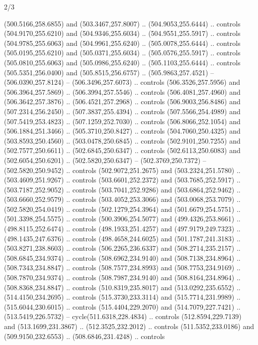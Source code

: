 \begin{flagdescription}{2/3}
\begin{scope}[xshift=0.5\flaglength,yshift=0.5\flagwidth,scale=\flagwidth/495.65]
\begin{scope}[y=0.8pt, x=0.8pt, yscale=-1,shift={(-463.76,-309.78)}]
  (500.5166,258.6855) and (503.3467,257.8007) .. (504.9053,255.6444) .. controls
  (504.9170,255.6210) and (504.9346,255.6034) .. (504.9551,255.5917) .. controls
  (504.9785,255.6063) and (504.9961,255.6240) .. (505.0078,255.6444) .. controls
  (505.0195,255.6210) and (505.0371,255.6034) .. (505.0576,255.5917) .. controls
  (505.0810,255.6063) and (505.0986,255.6240) .. (505.1103,255.6444) .. controls
  (505.5351,256.0400) and (505.8515,256.6757) .. (505.9863,257.4521) --
  (506.0390,257.8124) -- (506.3496,257.6073) .. controls (506.3526,257.5956) and
  (506.3964,257.5869) .. (506.3994,257.5546) .. controls (506.4081,257.4960) and
  (506.3642,257.3876) .. (506.4521,257.2968) .. controls (506.9003,256.8486) and
  (507.2314,256.2450) .. (507.3837,255.4394) .. controls (507.5566,254.4989) and
  (507.5419,253.4823) .. (507.1259,252.7030) .. controls (506.8066,252.1054) and
  (506.1884,251.3466) .. (505.3710,250.8427) .. controls (504.7060,250.4325) and
  (503.8593,250.4560) .. (503.0478,250.6845) .. controls (502.9101,250.7255) and
  (502.7577,250.6611) .. (502.6845,250.6347) .. controls (502.6113,250.6083) and
  (502.6054,250.6201) .. (502.5820,250.6347) -- (502.3769,250.7372) --
  (502.5820,250.9452) .. controls (502.9072,251.2675) and (503.2324,251.5780) ..
  (503.4609,251.9267) .. controls (503.6601,252.2372) and (503.7685,252.5917) ..
  (503.7187,252.9052) .. controls (503.7041,252.9286) and (503.6864,252.9462) ..
  (503.6660,252.9579) .. controls (503.4052,253.3066) and (503.0068,253.7079) ..
  (502.5820,254.0419) .. controls (502.1279,254.3964) and (501.6679,254.5751) ..
  (501.3398,254.5575) .. controls (500.3906,254.5077) and (499.4326,253.8661) ..
  (498.8115,252.6474) .. controls (498.1933,251.4257) and (497.9179,249.7323) ..
  (498.1435,247.6376) .. controls (498.4658,244.6025) and (501.1787,241.3183) ..
  (503.8271,238.8603) .. controls (506.2265,236.6337) and (508.2714,235.2157) ..
  (508.6845,234.9374) .. controls (508.6962,234.9140) and (508.7138,234.8964) ..
  (508.7343,234.8847) .. controls (508.7577,234.8993) and (508.7753,234.9169) ..
  (508.7870,234.9374) .. controls (508.7987,234.9140) and (508.8164,234.8964) ..
  (508.8368,234.8847) .. controls (510.8319,235.8017) and (513.0292,235.6552) ..
  (514.4150,234.2695) .. controls (515.3730,233.3114) and (515.7714,231.9989) ..
  (515.6044,230.6015) .. controls (515.4404,229.2070) and (514.7079,227.7421) ..
  (513.5419,226.5732) -- cycle(511.6318,228.4834) .. controls
  (512.8594,229.7139) and (513.1699,231.3867) .. (512.3525,232.2012) .. controls
  (511.5352,233.0186) and (509.9150,232.6553) .. (508.6846,231.4248) .. controls

\end{scope}
\end{scope}
\end{flagdescription}
